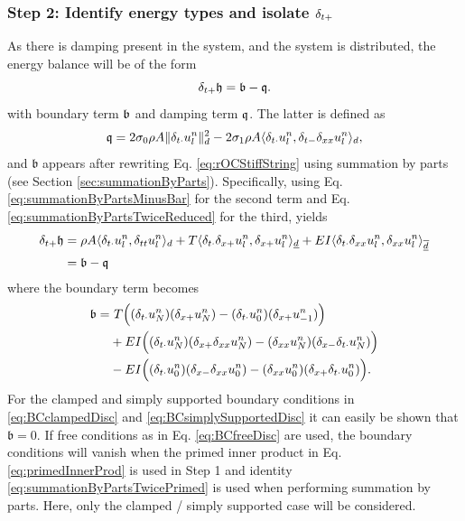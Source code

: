 {\subsubsection{Step 2: Identify energy types and isolate $\delta_{t+}$}
As there is damping present in the system, and the system is distributed, the energy balance will be of the form 
\begin{equation}
    \delta_{t+} \mathfrak{h} = \mathfrak{b}-\mathfrak{q}.
\end{equation}
with boundary term $\mathfrak{b}$ and damping term $\mathfrak{q}$. The latter is defined as 
\begin{equation}\label{eq:dampingTermStiffString}
    \mathfrak{q} = 2\sigma_{0} \rho A \lVert\delta_{t\cdot}u_l^n\rVert_d^2 - 2 \sigma_{1} \rho A \langle \delta_{t\cdot} u_l^n, \delta_{t-} \delta_{xx} u_l^n \rangle_d,
\end{equation}
and $\mathfrak{b}$ appears after rewriting Eq. \eqref{eq:rOCStiffString} using summation by parts (see Section \ref{sec:summationByParts}). Specifically, using Eq. \eqref{eq:summationByPartsMinusBar} for the second term and Eq. \eqref{eq:summationByPartsTwiceReduced} for the third, yields
\begin{align*}
    \delta_{t+} \mathfrak{h} &= \rho A \langle \delta_{t\cdot} u_l^n, \delta_{tt} u_l^n \rangle_d + T \langle \delta_{t\cdot} \delta_{x+} u_l^n, \delta_{x+} u_l^n\rangle_{\underline{d}} + EI \langle \delta_{t\cdot} \delta_{xx} u_l^n, \delta_{xx} u_l^n \rangle_{\overline{\underline{d}}} \\
    &= \mathfrak{b} - \mathfrak{q}
\end{align*}
where the boundary term becomes
\begin{align*}
    \mathfrak{b} =&\ T\Big((\delta_{t\cdot} u_N^n)(\delta_{x+} u_N^n) - (\delta_{t\cdot} u_0^n) (\delta_{x+} u_{-1}^n)\Big) \\
    &+ EI \Big((\delta_{t\cdot} u_N^n)(\delta_{x+} \delta_{xx} u_N^n) - (\delta_{xx} u_N^n)(\delta_{x-} \delta_{t\cdot} u_N^n) \Big)\\
    &- EI \Big((\delta_{t\cdot} u_0^n)(\delta_{x-} \delta_{xx} u_0^n) - (\delta_{xx} u_0^n)(\delta_{x+} \delta_{t\cdot} u_0^n)\Big).
\end{align*}
For the clamped and simply supported boundary conditions in \eqref{eq:BCclampedDisc} and \eqref{eq:BCsimplySupportedDisc} it can easily be shown that $\mathfrak{b} = 0$. If free conditions as in Eq. \eqref{eq:BCfreeDisc} are used, the boundary conditions will vanish when the primed inner product in Eq. \eqref{eq:primedInnerProd} is used in Step 1 and identity \eqref{eq:summationByPartsTwicePrimed} is used when performing summation by parts. Here, only the clamped / simply supported case will be considered. 

}

